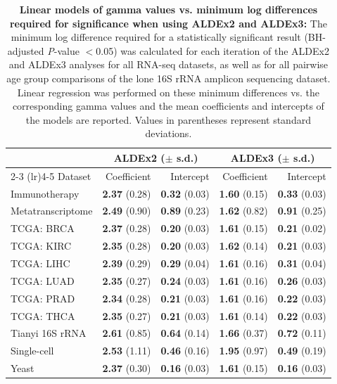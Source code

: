 \documentclass[10pt,letterpaper]{article}
\begin{document}
\begin{table}[H]
    \caption{\textbf{Linear models of gamma values vs. minimum log differences required for significance when using ALDEx2 and ALDEx3:} The minimum log difference required for a statistically significant result (BH-adjusted \textit{P}-value $<$0.05) was calculated for each iteration of the ALDEx2 and ALDEx3 analyses for all RNA-seq datasets, as well as for all pairwise age group comparisons of the lone 16S rRNA amplicon sequencing dataset. Linear regression was performed on these minimum differences vs. the corresponding gamma values and the mean coefficients and intercepts of the models are reported. Values in parentheses represent standard deviations.}
    \centering
    \begin{tabular}{lrrrr}
         \toprule
         & \multicolumn{2}{c}{ALDEx2 ($\pm$ s.d.)} & \multicolumn{2}{c}{ALDEx3 ($\pm$ s.d.)}\\
         \cmidrule(lr){2-3} \cmidrule(lr){4-5}
         Dataset &  Coefficient & Intercept & Coefficient & Intercept\\
         \midrule
         Immunotherapy & \textbf{2.37} (0.28) & \textbf{0.32} (0.03) & \textbf{1.60} (0.15) & \textbf{0.33} (0.03) \\
         Metatranscriptome & \textbf{2.49} (0.90) & \textbf{0.89} (0.23) & \textbf{1.62} (0.82) & \textbf{0.91} (0.25) \\
         TCGA: BRCA & \textbf{2.37} (0.28) & \textbf{0.20} (0.03) & \textbf{1.61} (0.15) & \textbf{0.21} (0.02) \\
         TCGA: KIRC & \textbf{2.35} (0.28) & \textbf{0.20} (0.03) & \textbf{1.62} (0.14) & \textbf{0.21} (0.03) \\
         TCGA: LIHC & \textbf{2.39} (0.29) & \textbf{0.29} (0.04) & \textbf{1.61} (0.16) & \textbf{0.31} (0.04) \\
         TCGA: LUAD & \textbf{2.35} (0.27) & \textbf{0.24} (0.03) & \textbf{1.61} (0.16) & \textbf{0.26} (0.03) \\
         TCGA: PRAD & \textbf{2.34} (0.28) & \textbf{0.21} (0.03) & \textbf{1.61} (0.16) & \textbf{0.22} (0.03) \\
         TCGA: THCA & \textbf{2.35} (0.27) & \textbf{0.21} (0.03) & \textbf{1.61} (0.14) & \textbf{0.22} (0.03) \\
         Tianyi 16S rRNA & \textbf{2.61} (0.85) & \textbf{0.64} (0.14) & \textbf{1.66} (0.37) & \textbf{0.72} (0.11) \\
         Single-cell & \textbf{2.53} (1.11) & \textbf{0.46} (0.16) & \textbf{1.95} (0.97) & \textbf{0.49} (0.19) \\
         Yeast & \textbf{2.37} (0.30) & \textbf{0.16} (0.03) & \textbf{1.61} (0.15) & \textbf{0.16} (0.03) \\
         \bottomrule
    \end{tabular}
    \label{tab:regression}
\end{table}
\end{document}
